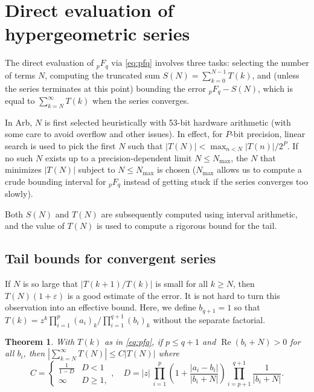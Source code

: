 \documentclass[11pt]{article}
\newtheorem{theorem}{Theorem}
\begin{document}
\section{Direct evaluation of hypergeometric series}

\label{sect:hypdirsum}

The direct evaluation of ${}_pF_q$ via \eqref{eq:pfq}
involves three tasks: selecting the number of terms $N$,
computing the truncated sum $S(N) = \sum_{k=0}^{N-1} T(k)$, and
(unless the series terminates at this point) bounding the error
${}_pF_q - S(N)$, which is equal to $\sum_{k=N}^{\infty} T(k)$ when
the series converges.

In Arb, $N$ is first selected heuristically with
53-bit hardware arithmetic (with some care to avoid overflow and other issues).
In effect, for $P$-bit precision,
linear search is used to pick the first $N$ such that
$|T(N)| < \max_{n < N} |T(n)| / 2^P$.
If no such $N$ exists up to a precision-dependent limit $N \le N_{\text{max}}$,
the $N$ that minimizes $|T(N)|$ subject to $N \le N_{\text{max}}$ is chosen
($N_{\text{max}}$
allows us to compute a crude bounding interval for
${}_pF_q$ instead of getting stuck if the series converges too slowly).

Both $S(N)$ and $T(N)$ are subsequently computed
using interval arithmetic, and the value of $T(N)$ is used to compute a
rigorous bound for the tail.

\subsection{Tail bounds for convergent series}

\label{sect:tails}

If $N$ is so large that $|T(k+1)/T(k)|$ is small for all $k \ge N$,
then $T(N) (1 + \varepsilon)$ is a good
estimate of the error.
It is not hard to turn this observation into an effective bound.
Here, we define $b_{q+1} = 1$ so that
$T(k) = z^k \prod_{i=1}^p (a_i)_k / \prod_{i=1}^{q+1} (b_i)_k$
without the separate factorial.

\begin{theorem}
\label{thm:pfqbound}
With $T(k)$ as in \eqref{eq:pfq},
if $p \le q + 1$ and $\operatorname{Re}(b_i+N) > 0$ for all $b_i$,
then $\left|\sum_{k=N}^{\infty} T(N)\right| \le C |T(N)|$ where
\begin{equation*}
C = \begin{cases} \frac{1}{1-D} & D < 1 \\ \infty & D \ge 1, \end{cases}, \quad
D = |z| \, \prod_{i=1}^p \left(1 + \frac{|a_i-b_i|}{|b_i+N|}\right) \prod_{i=p+1}^{q+1} \frac{1}{|b_i + N|}.
\end{equation*}
\end{theorem}
\end{document}
